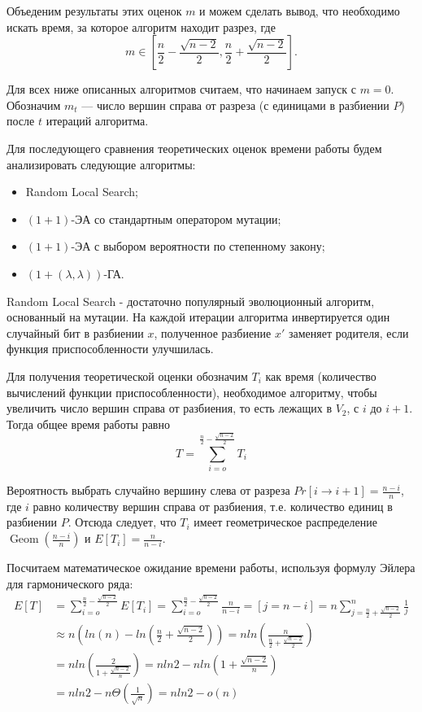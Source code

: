 \documentclass[times]{itmo-student-thesis}
\newcommand{\alglambdaf}{${(1 + (\lambda , \lambda))}$-ГА\xspace}
\newcommand{\oea}{\mbox{$(1 + 1)$-ЭА}\xspace}
\DeclareMathOperator{\Geom}{Geom}
\begin{document}
Объеденим результаты этих оценок $m$ и можем сделать вывод, что необходимо искать время, за которое алгоритм находит разрез, где
$$
m \in \left[\frac{n}{2} -\frac{\sqrt{n-2}}{2},  \frac{n}{2} + \frac{\sqrt{n-2}}{2}\right].
$$

Для всех ниже описанных алгоритмов считаем, что начинаем запуск с $m = 0$. Обозначим $m_t$ --- число вершин справа от разреза (с единицами в разбиении $P$) после $t$ итераций алгоритма.

Для последующего сравнения теоретических оценок времени работы будем анализировать следующие алгоритмы:
\begin{itemize}
  \item Random Local Search;
  \item \oea со стандартным оператором мутации;
  \item \oea с выбором вероятности по степенному закону;
  \item \alglambdaf.
\end{itemize}
Random Local Search - достаточно популярный эволюционный алгоритм, основанный на мутации. На каждой итерации алгоритма инвертируется один случайный бит в разбиении $x$, полученное разбиение $x'$ заменяет родителя, если функция приспособленности улучшилась.

Для получения теоретической оценки обозначим $T_i$ как время (количество вычислений функции приспособленности), необходимое алгоритму, чтобы увеличить число вершин справа от разбиения, то есть лежащих в $V_2$, с $i$ до $i + 1$.
Тогда общее время работы равно
$$
  T = \sum_{i=o}^{\frac{n}{2} - \frac{\sqrt{n-2}}{2}} T_i
$$

Вероятность выбрать случайно вершину слева от разреза $Pr[i \rightarrow i + 1] = \frac{n-i}{n}$, где $i$ равно количеству вершин справа от разбиения, т.е. количество единиц в разбиении $P$.
Отсюда следует, что  $T_i$ имеет геометрическое распределение $\Geom(\frac{n-i}{n})$ и $E[T_i] = \frac{n}{n-i}$.

Посчитаем математическое ожидание времени работы, используя формулу Эйлера для гармонического ряда:
\begin{align*}
    E[T] &=
                \sum_{i=o}^{\frac{n}{2} - \frac{\sqrt{n-2}}{2}} E[T_i] =
                \sum_{i=o}^{\frac{n}{2} - \frac{\sqrt{n-2}}{2}} \frac{n}{n-i} = [j = n - i] = n \sum_{j=\frac{n}{2} + \frac{\sqrt{n-2}}{2}}^{n} \frac{1}{j}  \\
        &\approx
                n\left(ln(n) - ln\left(\frac{n}{2} + \frac{\sqrt{n-2}}{2}\right)\right) =
                n ln\left(\frac{n}{\frac{n}{2} + \frac{\sqrt{n-2}}{2}}\right) \\
        &=
                n ln\left(\frac{2}{1 + \frac{\sqrt{n-2}}{n}}\right) = nln2 - nln\left(1 + \frac{\sqrt{n-2}}{n}\right) \\
        &= nln2 - n\Theta\left(\frac{1}{\sqrt{n}}\right) = nln2 - o(n)
\end{align*}
\end{document}
